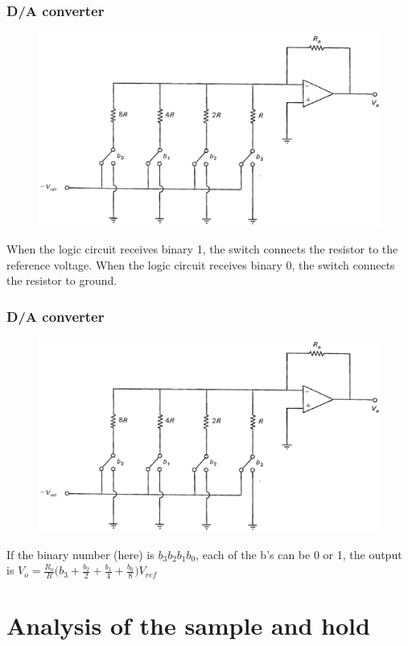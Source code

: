 \begin{frame}
	\frametitle{D/A converter}
	\vspace{-2ex}
	\begin{figure}
		\includegraphics[width=0.8\linewidth]{DAconverter}
	\end{figure}
	When the logic circuit receives binary 1, the switch connects the resistor to the reference voltage. When the logic circuit receives binary 0, the switch connects the resistor to ground.
\end{frame}

\begin{frame}
	\frametitle{D/A converter}
	\vspace{-3ex}
	\begin{figure}
		\includegraphics[width=0.8\linewidth]{DAconverter}
	\end{figure}
	If the binary number (here) is $b_3b_2b_1b_0$, each of the b's can be 0 or 1, the output is $V_o = \frac{R_o}{R} \Big(b_3+\frac{b_2}{2} + \frac{b_1}{4}+\frac{b_0}{8}\Big) V_{ref}$
\end{frame}

\section{Analysis of the sample and hold}

